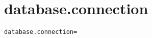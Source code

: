 \section{database.connection}
\label{configuration:DatabaseConnection}
\ClearAPI
\TODO
{}
\begin{lstlisting}[style=Props,caption={Usage example for \textit{database.connection}}]
database.connection=
\end{lstlisting}